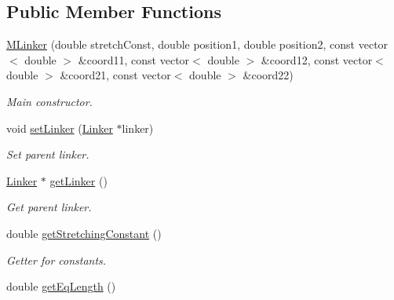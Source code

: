 \subsection*{Public Member Functions}
\begin{DoxyCompactItemize}
\item 
\hyperlink{classMLinker_a50f4462e4081c1cdf36f0c0ced8d4151}{M\+Linker} (double stretch\+Const, double position1, double position2, const vector$<$ double $>$ \&coord11, const vector$<$ double $>$ \&coord12, const vector$<$ double $>$ \&coord21, const vector$<$ double $>$ \&coord22)
\begin{DoxyCompactList}\small\item\em Main constructor. \end{DoxyCompactList}\item 
void \hyperlink{classMLinker_a48568e299d0e6d0149fe53c9ee34b99a}{set\+Linker} (\hyperlink{classLinker}{Linker} $\ast$linker)
\begin{DoxyCompactList}\small\item\em Set parent linker. \end{DoxyCompactList}\item 
\hyperlink{classLinker}{Linker} $\ast$ \hyperlink{classMLinker_a4ae89966828d6f13751b3d0429995e71}{get\+Linker} ()
\begin{DoxyCompactList}\small\item\em Get parent linker. \end{DoxyCompactList}\end{DoxyCompactItemize}
{\bf }\par
\begin{DoxyCompactItemize}
\item 
double \hyperlink{classMLinker_a6fe829d45b8889d95f8ad7ffdb143d61}{get\+Stretching\+Constant} ()
\begin{DoxyCompactList}\small\item\em Getter for constants. \end{DoxyCompactList}\item 
double \hyperlink{classMLinker_ad9e3e86cf88e4e06d1c16f6851c2f97c}{get\+Eq\+Length} ()
\end{DoxyCompactItemize}

